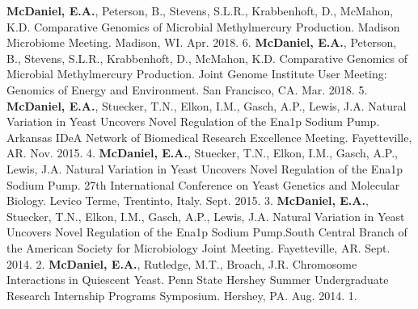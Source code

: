 


\begin{cvpubs}
    \cvpub
        {\textbf{McDaniel, E.A.}, Peterson, B., Stevens, S.L.R., Krabbenhoft, D., McMahon, K.D. Comparative Genomics of Microbial Methylmercury Production. Madison Microbiome Meeting. Madison, WI. Apr. 2018.} %
        {6.} %
    \cvpub
        {\textbf{McDaniel, E.A.}, Peterson, B., Stevens, S.L.R., Krabbenhoft, D., McMahon, K.D. Comparative Genomics of Microbial Methylmercury Production. Joint Genome Institute User Meeting: Genomics of Energy and Environment. San Francisco, CA. Mar. 2018.} %
        {5.} %
    \cvpub
        {\textbf{McDaniel, E.A.}, Stuecker, T.N., Elkon, I.M., Gasch, A.P., Lewis, J.A. Natural Variation in Yeast Uncovers Novel Regulation of the Ena1p Sodium Pump. Arkansas IDeA Network of Biomedical Research Excellence Meeting. Fayetteville, AR. Nov. 2015.}       
        {4.}
    \cvpub
        {\textbf{McDaniel, E.A.}, Stuecker, T.N., Elkon, I.M., Gasch, A.P., Lewis, J.A. Natural Variation in Yeast Uncovers Novel Regulation of the Ena1p Sodium Pump. 27th International Conference on Yeast Genetics and Molecular Biology. Levico Terme, Trentinto, Italy. Sept. 2015.}
        {3.}
    \cvpub
        {\textbf{McDaniel, E.A.}, Stuecker, T.N., Elkon, I.M., Gasch, A.P., Lewis, J.A. Natural Variation in Yeast Uncovers Novel Regulation of the Ena1p Sodium Pump.South Central Branch of the American Society for Microbiology Joint Meeting. Fayetteville, AR. Sept. 2014.}
        {2.}
    \cvpub
        {\textbf{McDaniel, E.A.}, Rutledge, M.T., Broach, J.R. Chromosome Interactions in Quiescent Yeast. Penn State Hershey Summer Undergraduate Research Internship Programs Symposium. Hershey, PA. Aug. 2014.}
        {1.}
\end{cvpubs}
